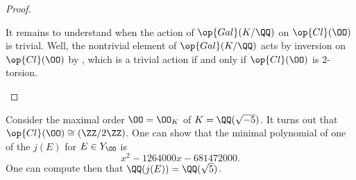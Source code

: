 \documentclass[../notes.tex]{subfiles}
\begin{document}
\begin{proof}
\begin{itemize}
		It remains to understand when the action of $\op{Gal}(K/\QQ)$ on $\op{Cl}(\OO)$ is trivial. Well, the nontrivial element of $\op{Gal}(K/\QQ)$ acts by inversion on $\op{Cl}(\OO)$ by , which is a trivial action if and only if $\op{Cl}(\OO)$ is $2$-torsion.
		\qedhere
	\end{itemize}
\end{proof}
\begin{example}
	Consider the maximal order $\OO=\OO_K$ of $K=\QQ(\sqrt{-5})$. It turns out that $\op{Cl}(\OO)\cong(\ZZ/2\ZZ)$. One can show that the minimal polynomial of one of the $j(E)$ for $E\in Y_\OO$ is
	\[x^2 - 1264000x - 681472000.\]
	One can compute then that $\QQ(j(E))=\QQ(\sqrt5)$.
\end{example}
\end{document}

